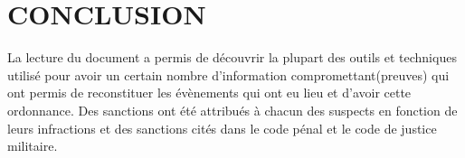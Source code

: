 \documentclass[]{article}
\begin{document}
\newpage
\section*{CONCLUSION}
La lecture du document a permis de découvrir la plupart des outils et techniques utilisé pour avoir un certain nombre d'information compromettant(preuves) qui ont permis de reconstituer les évènements qui ont eu lieu et d'avoir cette ordonnance. Des sanctions ont été attribués à chacun des suspects en fonction de leurs infractions et des sanctions cités dans le code pénal et le code de justice militaire.
\end{document}
